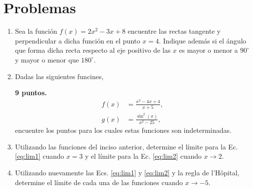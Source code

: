 \documentclass{article}
\begin{document}



\section{Problemas} %
\label{sec:problemas}

\begin{enumerate}

\item Sea la función $f(x)= 2x^{2} -3x + 8$ encuentre las rectas tangente y
perpendicular a dicha función en el punto $x=4$. Indique además si el ángulo que
forma dicha recta respecto al eje positivo de las $x$ es mayor o menor a
$90^{\circ}$ y mayor o menor que $180^{\circ}$.

\item Dadas las siguientes funcines, 

\hfill \textbf{9 puntos.}
\begin{align}
f(x) &= \frac{x^{2} - 4x  + 4 }{x+5}, \label{eq:lim1}
\\
g(x) &= \frac{\sin^{2}(x)}{x^{2}-25}, \label{eq:lim2}
\end{align}
encuentre los puntos para los cuales estas funciones son indeterminadas.

\item Utilizando las funciones del inciso anterior, determine el límite para la
Ec. \eqref{eq:lim1} cuando $x=3$ y el límite para la Ec. \eqref{eq:lim2} cuando
$x\rightarrow2$.

\item Utilizando nuevamente las Ecs. \eqref{eq:lim1} y \eqref{eq:lim2} y la
regla de l'H\^opital, determine el límite de cada una de las funciones cuando
$x\rightarrow-5$.


\end{enumerate}






\end{document}
